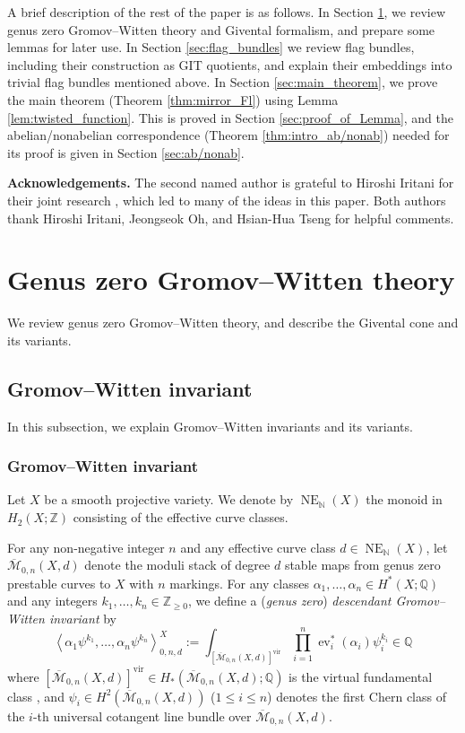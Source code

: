 \documentclass[a4paper,12pt]{amsart}
\numberwithin{equation}{section}
\theoremstyle{definition}
\newcommand{\Z}{\mathbb{Z}}
\newcommand{\N}{\mathbb{N}}
\newcommand{\Q}{\mathbb{Q}}
\newcommand{\cM}{\mathcal{M}}
\newcommand{\ovcM}{\overline{\cM}}
\newcommand{\ev}{\operatorname{ev}}
\newcommand{\vir}{{\operatorname{vir}}}
\newcommand{\NE}{\operatorname{NE}_{\N}}
\def\corr#1{\left\langle#1 \right\rangle}
\begin{document}
A brief description of the rest of the paper is as follows.
In Section \ref{sec:GW}, we review genus zero Gromov--Witten theory and Givental formalism, and prepare some lemmas for later use. In Section \ref{sec:flag_bundles} we review flag bundles, including their construction as GIT quotients, and explain their embeddings into trivial flag bundles mentioned above.
In Section \ref{sec:main_theorem}, we prove the main theorem (Theorem \ref{thm:mirror_Fl}) using Lemma \ref{lem:twisted_function}.
This is proved in Section \ref{sec:proof_of_Lemma}, and the abelian/nonabelian correspondence (Theorem \ref{thm:intro_ab/nonab}) needed for its proof is given in Section \ref{sec:ab/nonab}.


\phantom{A}

\noindent
\textbf{Acknowledgements.}
The second named author is grateful to Hiroshi Iritani for their joint research \cite{IK:quantum}, which led to many of the ideas in this paper. Both authors thank Hiroshi Iritani, Jeongseok Oh, and Hsian-Hua Tseng for helpful comments.

\section{Genus zero Gromov--Witten theory}\label{sec:GW}
We review genus zero Gromov--Witten theory, and describe the Givental cone and its variants.

\subsection{Gromov--Witten invariant}
In this subsection, we explain Gromov--Witten invariants and its variants.

\subsubsection{Gromov--Witten invariant}
Let $X$ be a smooth projective variety.
We denote by $\NE(X)$ the monoid in $H_2(X;\Z)$ consisting of the effective curve classes.

For any non-negative integer $n$ and any effective curve class $d\in\NE(X)$, let $\ovcM_{0,n}(X,d)$ denote the moduli stack of degree $d$ stable maps from genus zero prestable curves to $X$ with $n$ markings.
For any classes $\alpha_1,\dots,\alpha_n\in H^*(X;\Q)$ and any integers $k_1,\dots,k_n\in\Z_{\geq0}$, we define a (\emph{genus zero}) \emph{descendant Gromov--Witten invariant} by
\[
\corr{\alpha_1\psi^{k_1},\dots,\alpha_n\psi^{k_n}}^X_{0,n,d} := \int_{[\ovcM_{0,n}(X,d)]^{\vir}}\prod^n_{i=1}\ev^*_i(\alpha_i)\psi_i^{k_i}\in\Q
\]
where $[\ovcM_{0,n}(X,d)]^\vir\in H_*(\ovcM_{0,n}(X,d);\Q)$ is the virtual fundamental class \cite{Behrend}, and $\psi_i\in H^2(\ovcM_{0,n}(X,d))$ ($1\leq i\leq n$) denotes the first Chern class of the $i$-th universal cotangent line bundle over $\ovcM_{0,n}(X,d)$.
\end{document}
